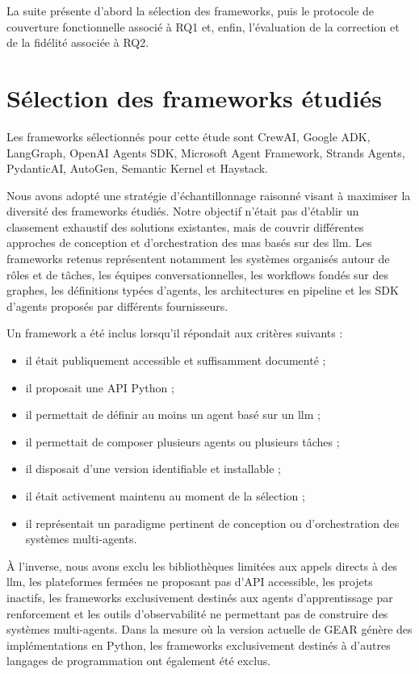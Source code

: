 La suite présente d'abord la sélection des frameworks, puis le protocole de
couverture fonctionnelle associé à RQ1 et, enfin, l'évaluation de la correction
et de la fidélité associée à RQ2.

\section{Sélection des frameworks étudiés}
\label{sec:selection-frameworks}

Les frameworks sélectionnés pour cette étude sont CrewAI, Google ADK,
LangGraph, OpenAI Agents SDK, Microsoft Agent Framework, Strands
Agents, PydanticAI, AutoGen, Semantic Kernel et Haystack.

Nous avons adopté une stratégie d'échantillonnage raisonné visant à
maximiser la diversité des frameworks étudiés. Notre objectif n'était
pas d'établir un classement exhaustif des solutions existantes, mais
de couvrir différentes approches de conception et d'orchestration des
\gls{mas} basés sur des \gls{llm}. Les frameworks retenus représentent
notamment les systèmes organisés autour de rôles et de tâches, les
équipes conversationnelles, les workflows fondés sur des graphes, les
définitions typées d'agents, les architectures en pipeline et les SDK
d'agents proposés par différents fournisseurs.

Un framework a été inclus lorsqu'il répondait aux critères suivants :

\begin{itemize}
    \item il était publiquement accessible et suffisamment documenté ;
    \item il proposait une API Python ;
    \item il permettait de définir au moins un agent basé sur un
    \gls{llm} ;
    \item il permettait de composer plusieurs agents ou plusieurs
    tâches ;
    \item il disposait d'une version identifiable et installable ;
    \item il était activement maintenu au moment de la sélection ;
    \item il représentait un paradigme pertinent de conception ou
    d'orchestration des systèmes multi-agents.
\end{itemize}

À l'inverse, nous avons exclu les bibliothèques limitées aux appels
directs à des \gls{llm}, les plateformes fermées ne proposant pas
d'API accessible, les projets inactifs, les frameworks exclusivement
destinés aux agents d'apprentissage par renforcement et les outils
d'observabilité ne permettant pas de construire des systèmes
multi-agents. Dans la mesure où la version actuelle de GEAR génère des
implémentations en Python, les frameworks exclusivement destinés à
d'autres langages de programmation ont également été exclus.


